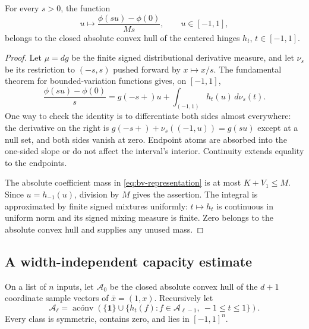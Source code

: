 \begin{lemma}
\label{lem:bv-profile}
For every $s>0$, the function
\[
 u\longmapsto\frac{\phi(su)-\phi(0)}{Ms},\qquad u\in[-1,1],
\]
belongs to the closed absolute convex hull of the centered hinges $h_t$, $t\in[-1,1]$.
\end{lemma}
\begin{proof}
Let $\mu=dg$ be the finite signed distributional derivative measure, and let $\nu_s$ be its restriction to $(-s,s)$ pushed forward by $x\mapsto x/s$. The fundamental theorem for bounded-variation functions gives, on $[-1,1]$,
\begin{equation}
 \frac{\phi(su)-\phi(0)}s
   =g(-s+)u+\int_{(-1,1)}h_t(u)\,d\nu_s(t).
 \label{eq:bv-representation}
\end{equation}
One way to check the identity is to differentiate both sides almost everywhere: the derivative on the right is $g(-s+)+\nu_s((-1,u))=g(su)$ except at a null set, and both sides vanish at zero. Endpoint atoms are absorbed into the one-sided slope or do not affect the interval's interior. Continuity extends equality to the endpoints.

The absolute coefficient mass in \eqref{eq:bv-representation} is at most $K+V_1\le M$. Since $u=h_{-1}(u)$, division by $M$ gives the assertion. The integral is approximated by finite signed mixtures uniformly: $t\mapsto h_t$ is continuous in uniform norm and its signed mixing measure is finite. Zero belongs to the absolute convex hull and supplies any unused mass.
\end{proof}

\subsection{A width-independent capacity estimate}
On a list of $n$ inputs, let $\mathcal A_0$ be the closed absolute convex hull of the $d+1$ coordinate sample vectors of $\bar x=(1,x)$. Recursively let
\[
 \mathcal A_\ell=\overline{\operatorname{aconv}}\left(
 \{\mathbf1\}\cup\{h_t(f):f\in\mathcal A_{\ell-1},\ -1\le t\le1\}\right).
\]
Every class is symmetric, contains zero, and lies in $[-1,1]^n$.

